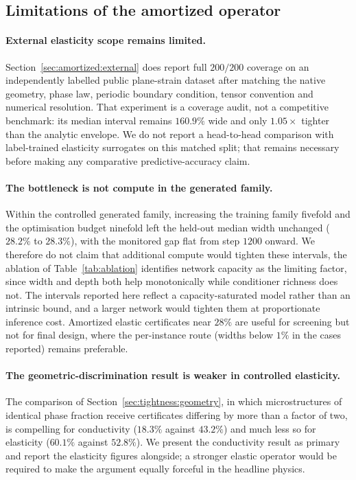 \subsection{Limitations of the amortized operator}

\paragraph{External elasticity scope remains limited.} Section~\ref{sec:amortized:external}
does report full $200/200$ coverage on an independently labelled public
plane-strain dataset after matching the native geometry, phase law, periodic
boundary condition, tensor convention and numerical resolution. That
experiment is a coverage audit, not a competitive benchmark: its median
interval remains $160.9\%$ wide and only $1.05\times$ tighter than the
analytic envelope. We do not report a head-to-head comparison with
label-trained elasticity surrogates on this matched split; that remains
necessary before making any comparative predictive-accuracy claim.

\paragraph{The bottleneck is not compute in the generated family.} Within
the controlled generated family, increasing the training family fivefold
and the optimisation budget ninefold left the held-out median
width unchanged ($28.2\%$ to $28.3\%$), with the monitored gap flat from
step $1200$ onward. We therefore do not claim that additional compute would
tighten these intervals, the ablation of Table~\ref{tab:ablation} identifies network capacity as the limiting factor, since width and depth both help monotonically while
conditioner richness does not. The intervals reported here reflect a
capacity-saturated model rather than an intrinsic bound, and a larger
network would tighten them at proportionate inference cost. Amortized elastic certificates near $28\%$ are useful for
screening but not for final design, where the per-instance route (widths
below $1\%$ in the cases reported) remains preferable.

\paragraph{The geometric-discrimination result is weaker in controlled
elasticity.} The comparison of Section~\ref{sec:tightness:geometry}, in which
microstructures of identical phase fraction receive certificates differing
by more than a factor of two, is compelling for conductivity ($18.3\%$
against $43.2\%$) and much less so for elasticity ($60.1\%$ against
$52.8\%$). We present the conductivity result as primary and report the
elasticity figures alongside; a stronger elastic operator would be required
to make the argument equally forceful in the headline physics.

